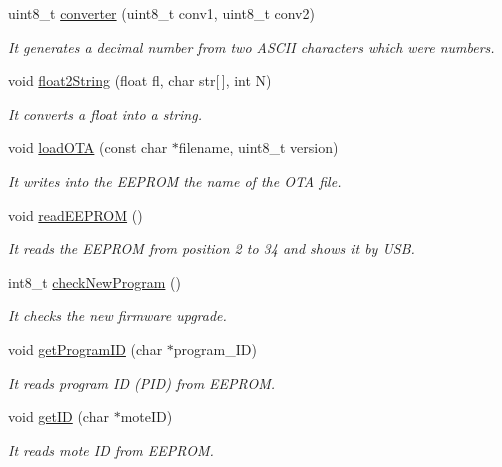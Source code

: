 \begin{DoxyCompactItemize}
uint8\+\_\+t \hyperlink{class_wasp_utils_ad0e85f1bb0f806bc318e46c6d203545b}{converter} (uint8\+\_\+t conv1, uint8\+\_\+t conv2)
\begin{DoxyCompactList}\small\item\em It generates a decimal number from two A\+S\+C\+II characters which were numbers. \end{DoxyCompactList}\item 
void \hyperlink{class_wasp_utils_a418cac28c38aecab8b71c9ff6ee25801}{float2\+String} (float fl, char str\mbox{[}$\,$\mbox{]}, int N)
\begin{DoxyCompactList}\small\item\em It converts a float into a string. \end{DoxyCompactList}\item 
void \hyperlink{class_wasp_utils_a8bbe5374a7c9c468a74690e49c89a84f}{load\+O\+TA} (const char $\ast$filename, uint8\+\_\+t version)
\begin{DoxyCompactList}\small\item\em It writes into the E\+E\+P\+R\+OM the name of the O\+TA file. \end{DoxyCompactList}\item 
void \hyperlink{class_wasp_utils_a675f5b12a72dc72fe88a9cf320a02e60}{read\+E\+E\+P\+R\+OM} ()
\begin{DoxyCompactList}\small\item\em It reads the E\+E\+P\+R\+OM from position 2 to 34 and shows it by U\+SB. \end{DoxyCompactList}\item 
int8\+\_\+t \hyperlink{class_wasp_utils_a174fc21f46973963be1c41a471768b31}{check\+New\+Program} ()
\begin{DoxyCompactList}\small\item\em It checks the new firmware upgrade. \end{DoxyCompactList}\item 
void \hyperlink{class_wasp_utils_ac57551cd8a38d8d8cd4998ada30803f1}{get\+Program\+ID} (char $\ast$program\+\_\+\+ID)
\begin{DoxyCompactList}\small\item\em It reads program ID (P\+ID) from E\+E\+P\+R\+OM. \end{DoxyCompactList}\item 
void \hyperlink{class_wasp_utils_a009a28f1273ad1da2ba14b39c657da30}{get\+ID} (char $\ast$mote\+ID)
\begin{DoxyCompactList}\small\item\em It reads mote ID from E\+E\+P\+R\+OM. \end{DoxyCompactList}\item 

\end{DoxyCompactItemize}
